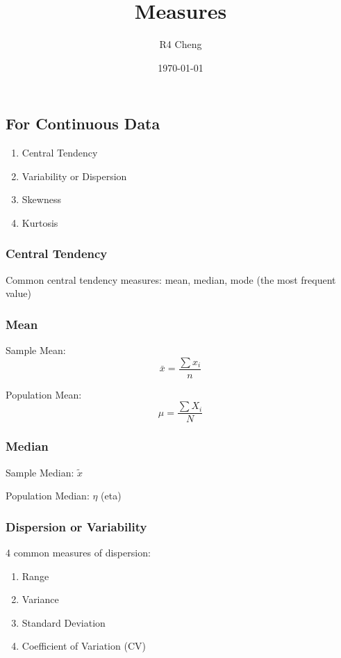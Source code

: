 \documentclass[12pt,a4paper]{article}
\title{Measures}
\author{R4 Cheng}
\date{\today}
\begin{document}
\maketitle

\subsection*{For Continuous Data}

\begin{enumerate}
    \item Central Tendency
    \item Variability or Dispersion
    \item Skewness
    \item Kurtosis
\end{enumerate}

\subsubsection*{Central Tendency}

Common central tendency measures: mean, median, mode (the most frequent value)

\subsubsection*{Mean}

Sample Mean:
\[
\bar{x} = \frac{\sum x_i}{n}
\]

Population Mean:
\[
\mu = \frac{\sum X_i}{N}
\]

\subsubsection*{Median}

Sample Median: $\tilde{x}$

Population Median: $\eta$ (eta)

\subsubsection*{Dispersion or Variability}

4 common measures of dispersion:

\begin{enumerate}
    \item Range
    \item Variance
    \item Standard Deviation
    \item Coefficient of Variation (CV)
\end{enumerate}
\end{document}
